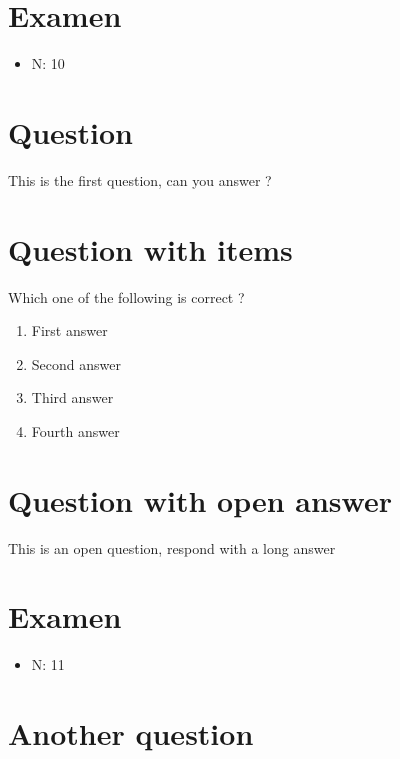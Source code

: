 \documentclass[a4paper,11pt,twoside]{article}
\begin{document}
\cleardoublepage

\section*{Examen}
\label{sec:org7e5e1bc}
\begin{itemize}
\item N: 10
\end{itemize}
\section*{Question}
\label{sec:orgdaa3126}

This is the first question, can you answer ?



\section*{Question with items}
\label{sec:org5ce8b24}

Which one of the following is correct ?

\begin{enumerate}
\item First answer
\item Second answer
\item Third answer
\item Fourth answer
\end{enumerate}



\section*{Question with open answer}
\label{sec:org49e4cea}

This is an open question, respond with a long answer


\subsection*{}
\label{sec:orgf32ea37}

\cleardoublepage

\section*{Examen}
\label{sec:orgf7f7309}
\begin{itemize}
\item N: 11
\end{itemize}
\section*{Another question}
\label{sec:orgf1654cb}
\end{document}
